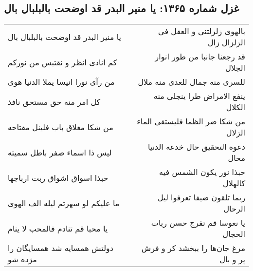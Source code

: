 \begin{center}
\section*{غزل شماره ۱۳۶۵: یا منیر البدر قد اوضحت بالبلبال بال}
\label{sec:1365}
\begin{longtable}{l p{0.5cm} r}
یا منیر البدر قد اوضحت بالبلبال بال
&&
بالهوی زلزلتنی و العقل فی الزلزال زال
\\
کم انادی انظر و نقتبس من نورکم
&&
قد رجعنا جانبا من طور انوار الجلال
\\
من رآی نورا انیسا یملا الدنیا هوی
&&
للسری منه جمال للعدی منه ملال
\\
کل امر منه حق مستحق نافذ
&&
ینفع الامراض طرا ینجلی منه الکلال
\\
من شکا مغلاق باب فلینل مفتاحه
&&
من شکا ضر الظما فلیستقی الماء الزلال
\\
لیس ذا اسماء صفر باطل سمیته
&&
دعوه التحقیق حال خدعه الدنیا محال
\\
حبذا اسواق اشواق ربت ارباجها
&&
حبذا نور یکون الشمس فیه کالهلال
\\
ما علیکم لو سهرتم لیله الف الهوی
&&
ربما تلقون ضیفا تعرفوا لیل الرحال
\\
یا محبا قم تنادم فالمحب لا ینام
&&
یا نعوسا قم تفرج حسن ربات الحجال
\\
دولتش همسایه شد همسایگان را مژده شو
&&
مرغ جان‌ها را ببخشد کر و فرش پر و بال
\\
\end{longtable}
\end{center}
